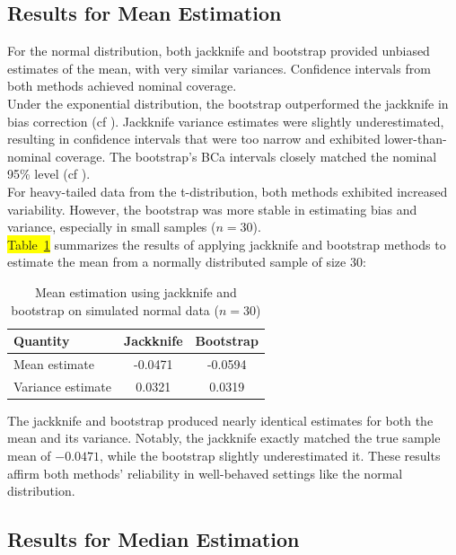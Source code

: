 \documentclass[aodsor,preprint]{imsart}
\numberwithin{equation}{section}
\theoremstyle{plain}
\begin{document}
\subsection{Results for Mean Estimation}

For the normal distribution, both jackknife and bootstrap provided unbiased estimates of the mean, with very similar variances. Confidence intervals from both methods achieved nominal coverage.\\

Under the exponential distribution, the bootstrap outperformed the jackknife in bias correction (cf \cite{efron1993introduction,davison1997bootstrap}). Jackknife variance estimates were slightly underestimated, resulting in confidence intervals that were too narrow and exhibited lower-than-nominal coverage. The bootstrap's BCa intervals closely matched the nominal 95\% level (cf \cite{efron1993introduction}).\\

For heavy-tailed data from the t-distribution, both methods exhibited increased variability. However, the bootstrap was more stable in estimating bias and variance, especially in small samples (\( n=30 \)).\\

 \colorbox{yellow}{Table~\ref{tab:mean-normal}} summarizes the results of applying jackknife and bootstrap methods to estimate the mean from a normally distributed sample of size 30:

\begin{table}[h!]
\centering
\caption{Mean estimation using jackknife and bootstrap on simulated normal data ($n=30$)}
\begin{tabular}{lcc}
\hline
\textbf{Quantity} & \textbf{Jackknife} & \textbf{Bootstrap} \\
\hline
Mean estimate     & -0.0471 & -0.0594 \\
Variance estimate &  0.0321 &  0.0319 \\
\hline
\end{tabular}
\label{tab:mean-normal}
\end{table}

The jackknife and bootstrap produced nearly identical estimates for both the mean and its variance. Notably, the jackknife exactly matched the true sample mean of  $-0.0471$, while the bootstrap slightly underestimated it. These results affirm both methods’ reliability in well-behaved settings like the normal distribution.

\subsection{Results for Median Estimation}
\end{document}
